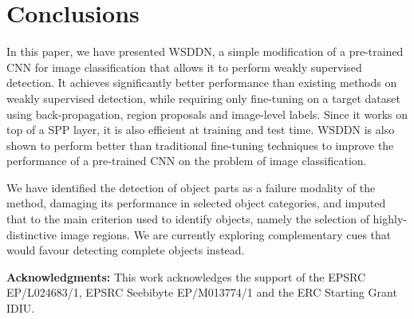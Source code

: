 \documentclass[10pt,twocolumn,letterpaper]{article}
\begin{document}
\section{Conclusions}\label{s:conclusions}
In this paper, we have presented WSDDN, a simple modification of a pre-trained CNN for image classification that allows it to perform weakly supervised detection. It achieves significantly better performance than existing methods on weakly supervised detection, while requiring only fine-tuning on a target dataset using back-propagation, region proposals and image-level labels. Since it works on top of a SPP layer, it is also efficient at training and test time. WSDDN is also shown to perform better than traditional fine-tuning techniques to improve the performance of a pre-trained CNN on the problem of image classification.

We have identified the detection of object parts as a failure modality of the method, damaging its performance in selected object categories, and imputed that to the main criterion used to identify objects, namely the selection of highly-distinctive image regions. We are currently exploring complementary cues that would favour detecting complete objects instead.


{\small
\textbf{Acknowledgments:} This work acknowledges the support of the EPSRC EP/L024683/1, EPSRC Seebibyte EP/M013774/1 and the ERC Starting Grant IDIU. 
}

\clearpage{
\small


% 
}
\end{document}
